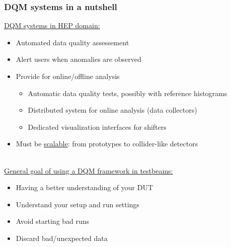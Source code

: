 \documentclass[presentation, 10pt]{beamer}
\begin{document}
\begin{frame}
  \frametitle{DQM systems in a nutshell}
  \footnotesize
  
  \underline{DQM systems in HEP domain:}
  \begin{itemize}
    \item Automated data quality assessement 
    \item Alert users when anomalies are observed
    \item Provide for online/offline analysis 
    \begin{itemize}
      \scriptsize
      \item Automatic data quality tests, possibly with reference histograms
      \item Distributed system for online analysis (data collectors)
      \item Dedicated visualization interfaces for shifters
    \end{itemize}
    \item Must be \underline{scalable}: from prototypes to collider-like detectors
  \end{itemize}
  ~\\
  \underline{General goal of using a DQM framework in testbeams:}
  \begin{itemize}
    \scriptsize
    \item Having a better understanding of your DUT
    \item Understand your setup and run settings
    \item Avoid starting bad runs
    \item Discard bad/unexpected data
  \end{itemize}

\end{frame}
\end{document}
